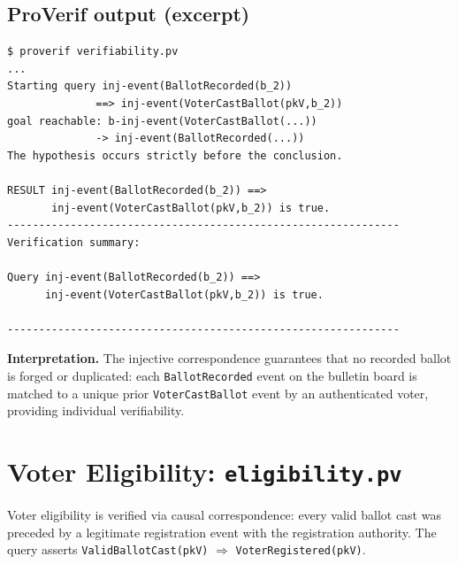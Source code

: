 \subsection*{ProVerif output (excerpt)}
\begin{footnotesize}
\begin{verbatim}
$ proverif verifiability.pv
...
Starting query inj-event(BallotRecorded(b_2))
              ==> inj-event(VoterCastBallot(pkV,b_2))
goal reachable: b-inj-event(VoterCastBallot(...))
              -> inj-event(BallotRecorded(...))
The hypothesis occurs strictly before the conclusion.

RESULT inj-event(BallotRecorded(b_2)) ==>
       inj-event(VoterCastBallot(pkV,b_2)) is true.
--------------------------------------------------------------
Verification summary:

Query inj-event(BallotRecorded(b_2)) ==>
      inj-event(VoterCastBallot(pkV,b_2)) is true.

--------------------------------------------------------------
\end{verbatim}
\end{footnotesize}

\textbf{Interpretation.} The injective correspondence guarantees that no recorded ballot is forged or duplicated: each \texttt{BallotRecorded} event on the bulletin board is matched to a unique prior \texttt{VoterCastBallot} event by an authenticated voter, providing individual verifiability.

\section{Voter Eligibility: \texttt{eligibility.pv}}
\label{sec:appx-proverif-eligibility}

Voter eligibility is verified via causal correspondence: every valid ballot cast was preceded by a legitimate registration event with the registration authority. The query asserts \texttt{ValidBallotCast(pkV)} $\Longrightarrow$ \texttt{VoterRegistered(pkV)}.

